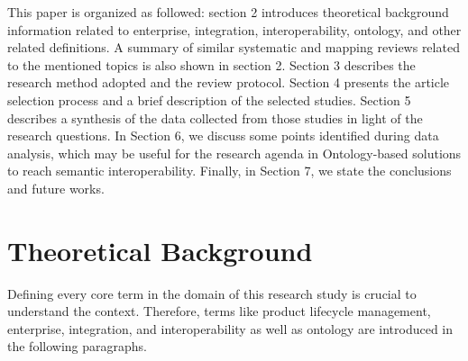 \documentclass[peerreview]{IEEEtran}
\begin{document}
This paper is organized as followed: section 2 introduces theoretical background information related to enterprise, integration, interoperability, ontology, and other related definitions. A summary of similar systematic and mapping reviews related to the mentioned topics is also shown in section 2. Section 3 describes the research method adopted and the review protocol. Section 4 presents the article selection process and a brief description of the selected studies. Section 5 describes a synthesis of the data collected from those studies in light of the research questions. In Section 6, we discuss some points identified during data analysis, which may be useful for the research agenda in Ontology-based solutions to reach semantic interoperability. Finally, in Section 7, we state the conclusions and future works.


\section{Theoretical Background}

Defining every core term in the domain of this research study is crucial to understand the context. Therefore, terms like product lifecycle management, enterprise, integration, and interoperability as well as ontology are introduced in the following paragraphs. 
\end{document}

